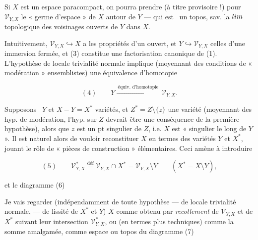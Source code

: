 \documentclass[11pt,a4paper]{article}
\begin{document}
Si $X$ est  un espace paracompact, on pourra prendre (à titre
provisoire !) pour $\mathcal{V}_{Y,X}$ le « germe d'espace » de $X$ autour de
$Y$ — qui est \ill\ un topos, sav. la $\varprojlim$ topologique des voisinages
ouverts de $Y$ dans $X$.

Intuitivement, $\mathcal{V}_{Y,X} \hookrightarrow X$ a les propriétés d'un
ouvert, et $Y \hookrightarrow \mathcal{V}_{Y,X}$ celles d'une immersion fermée,
et (3) constitue une factorisation canonique de (1). L'hypothèse de locale
trivialité normale implique (moyennant des conditions de « modération »
ensemblistes) une équivalence d'homotopie

\[
  (4) \qquad Y \xrightarrow{\ \text{équiv. d'homotopie}\ } \mathcal{V}_{Y,X}.
\]


Supposons \ill\ $Y$ et $X - Y = X^{*}$  variétés, et
$Z^{*} = Z \setminus \{z\}$ une variété (moyennant des hyp. de modération,
l'hyp. sur $Z$ devrait être une conséquence de la première hypothèse), alors
que $z$ est un pt singulier de $Z$, i.e. $X$ est « singulier le long de $Y$ ».
Il est naturel alors de vouloir reconstituer $X$ en termes des variétés $Y$ et
$X^{*}$, \page{28} jouant le rôle de « pièces de construction »
élémentaires. Ceci amène à introduire

\[
  (5) \qquad \mathcal{V}^{*}_{Y,X} \overset{\text{déf}}{=}
    \mathcal{V}_{Y,X} \cap X^{*} = \mathcal{V}_{Y,X} \setminus Y
    \qquad (X^{*} = X \setminus Y),
\]

et le diagramme (6)


Je vais regarder (indépendamment de toute hypothèse — de locale trivialité
normale, — de lissité de $X^{*}$ et $Y$) $X$ comme obtenu par
\emph{recollement} de $\mathcal{V}_{Y,X}$ et de $X^{*}$ suivant leur
intersection $\mathcal{V}^{*}_{Y,X}$, ou (en termes plus techniques) comme la
somme amalgamée, comme espace ou topos \uncertain{limite} du diagramme (7)

\end{document}
